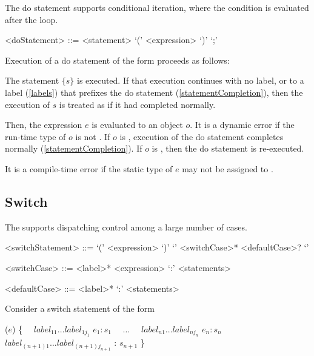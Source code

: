\documentclass[makeidx]{article}
\begin{document}
{\LMHash{}%
The do statement supports conditional iteration, where the condition is evaluated after the loop.

\begin{grammar}
<doStatement> ::= \DO{} <statement> \WHILE{} `(' <expression> `)' `;'
\end{grammar}

\LMHash{}%
Execution of a do statement of the form  proceeds as follows:

\LMHash{}%
The statement $\{s\}$ is executed.
If that execution continues with no label, or to a label (\ref{labels}) that prefixes the do statement (\ref{statementCompletion}), then the execution of $s$ is treated as if it had completed normally.

\LMHash{}%
Then, the expression $e$ is evaluated to an object $o$.
It is a dynamic error if the run-time type of $o$ is not .
If $o$ is \FALSE{}, execution of the do statement completes normally (\ref{statementCompletion}).
If $o$ is \TRUE{}, then the do statement is re-executed.

\LMHash{}%
It is a compile-time error if the static type of $e$ may not be assigned to .


\subsection{Switch}

\LMHash{}%
The  supports dispatching control among a large number of cases.

\begin{grammar}
<switchStatement> ::= \gnewline{}
  \SWITCH{} `(' <expression> `)' `{' <switchCase>* <defaultCase>? `}'

<switchCase> ::= <label>* \CASE{} <expression> `:' <statements>

<defaultCase> ::= <label>* \DEFAULT{} `:' <statements>
\end{grammar}

\LMHash{}%
Consider a switch statement of the form

\begin{normativeDartCode}
\SWITCH{} ($e$) \{
\ \ $label_{11} \ldots label_{1j_1}$ \CASE{} $e_1: s_1$
\ \ $\ldots$
\ \ $label_{n1} \ldots label_{nj_n}$ \CASE{} $e_n: s_n$
\ \ $label_{(n+1)1} \ldots label_{(n+1)j_{n+1}}$ \DEFAULT{}: $s_{n+1}$
\}
\end{normativeDartCode}

}
\end{document}
